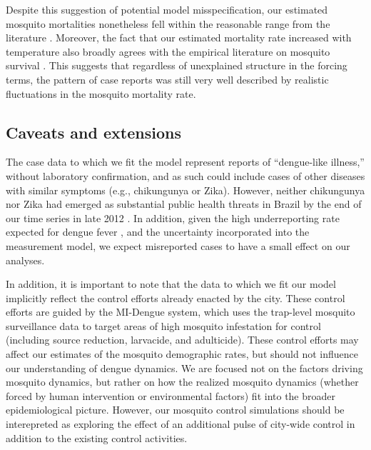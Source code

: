 \documentclass[10pt,letterpaper]{article}
\begin{document}
Despite this suggestion of potential model misspecification, our estimated mosquito mortalities nonetheless fell within the reasonable range from the literature \cite{Maciel-de-Freitas2008, Brady2013}.
Moreover, the fact that our estimated mortality rate increased with temperature also broadly agrees with the empirical literature on mosquito survival \cite{Yang2009, Brady2013}.
This suggests that regardless of unexplained structure in the forcing terms, the pattern of case reports was still very well described by realistic fluctuations in the mosquito mortality rate.

\subsection*{Caveats and extensions}

The case data to which we fit the model represent reports of ``dengue-like illness,'' without laboratory confirmation, and as such could include cases of other diseases with similar symptoms (e.g., chikungunya or Zika).
However, neither chikungunya nor Zika had emerged as substantial public health threats in Brazil by the end of our time series in late 2012 \cite{PAHO2014, PAHO2015}.
In addition, given the high underreporting rate expected for dengue fever \cite{Silva2016}, and the uncertainty incorporated into the measurement model, we expect misreported cases to have a small effect on our analyses.

In addition, it is important to note that the data to which we fit our model implicitly reflect the control efforts already enacted by the city.
These control efforts are guided by the MI-Dengue system, which uses the trap-level mosquito surveillance data to target areas of high mosquito infestation for control (including source reduction, larvacide, and adulticide)\cite{Eiras2009}.
These control efforts may affect our estimates of the mosquito demographic rates, but should not influence our understanding of dengue dynamics.
We are focused not on the factors driving mosquito dynamics, but rather on how the realized mosquito dynamics (whether forced by human intervention or environmental factors) fit into the broader epidemiological picture.
However, our mosquito control simulations should be interepreted as exploring the effect of an additional pulse of city-wide control in addition to the existing control activities.
\end{document}
